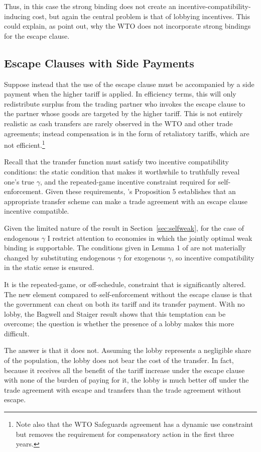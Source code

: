 \documentclass[12pt]{article}
\newcommand{\ga}{\gamma}
\begin{document}
Thus, in this case the strong binding does not create an incentive-compatibility-inducing cost, but again the central problem is that of lobbying incentives. This could explain, as \Textcite{bs2005} point out, why the WTO does not incorporate strong bindings for the escape clause.

\subsection{Escape Clauses with Side Payments}
Suppose instead that the use of the escape clause must be accompanied by a side payment when the higher tariff is applied. In efficiency terms, this will only redistribute surplus from the trading partner who invokes the escape clause to the partner whose goods are targeted by the higher tariff. This is not entirely realistic as cash transfers are rarely observed in the WTO and other trade agreements; instead compensation is in the form of retaliatory tariffs, which are not efficient.\footnote{Note also that the WTO Safeguards agreement has a dynamic use constraint but removes the requirement for compensatory action in the first three years.}

Recall that the transfer function must satisfy two incentive compatibility conditions: the static condition that makes it worthwhile to truthfully reveal one's true $\ga$, and the repeated-game incentive constraint required for self-enforcement. Given these requirements, \Textcite{bs2005}'s Proposition 5 establishes that an appropriate transfer scheme can make a trade agreement with an escape clause incentive compatible.

Given the limited nature of the result in Section~\ref{sec:selfweak}, for the case of endogenous $\ga$ I restrict attention to economies in which the jointly optimal weak binding is supportable. The conditions given in Lemma 1 of \Textcite{bs2005} are not materially changed by substituting endogenous $\ga$ for exogenous $\ga$, so incentive compatibility in the static sense is ensured.

It is the repeated-game, or off-schedule, constraint that is significantly altered. The new element compared to self-enforcement without the escape clause is that the government can cheat on both its tariff and its transfer payment. With no lobby, the Bagwell and Staiger result shows that this temptation can be overcome; the question is whether the presence of a lobby makes this more difficult.

The answer is that it does not. Assuming the lobby represents a negligible share of the population, the lobby does not bear the cost of the transfer. In fact, because it receives all the benefit of the tariff increase under the escape clause with none of the burden of paying for it, the lobby is much better off under the trade agreement with escape and transfers than the trade agreement without escape.
\end{document}
